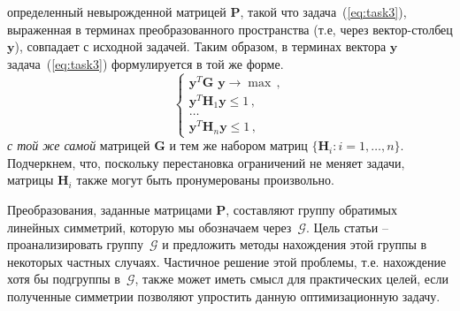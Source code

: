 определенный невырожденной матрицей $\textbf{P}$, такой что задача~(\ref{eq:task3}), выраженная в терминах преобразованного пространства
(т.е, через вектор-столбец $\textbf{y} $), совпадает с исходной задачей. Таким образом, в терминах вектора $\textbf{y}$ задача~(\ref{eq:task3}) формулируется в той же форме.
%
\begin{equation}
\label{eq:Tinit}
\left\{
\begin{array}{l}
\displaystyle
\textbf{y}^T \textbf{G y} \to {\max} \, , \\
\displaystyle
\textbf{y}^T\textbf{H}_1\textbf{y} \le  1 \, , \\
\displaystyle
\dots \\
\textbf{y}^T\textbf{H}_n\textbf{y} \le 1 \, ,
\end{array}
\right.
\end{equation}
%
\textit{с той же самой} матрицей $\textbf{G} $ и тем же набором матриц $\{\textbf{H}_i: i=1,\dots,n\}$. Подчеркнем, что, поскольку перестановка ограничений не меняет задачи, матрицы $\textbf{H}_i$ также могут быть пронумерованы произвольно.

Преобразования, заданные матрицами $\textbf{P}$, составляют группу обратимых линейных симметрий, которую мы обозначаем через~$\mathcal G$. Цель статьи -- проанализировать группу~$\mathcal G$ и предложить методы нахождения этой группы {в некоторых частных случаях}. Частичное решение этой проблемы, т.е. нахождение хотя бы подгруппы в~$\mathcal G$, также может иметь смысл для практических целей, если полученные симметрии позволяют упростить данную оптимизационную задачу. 

